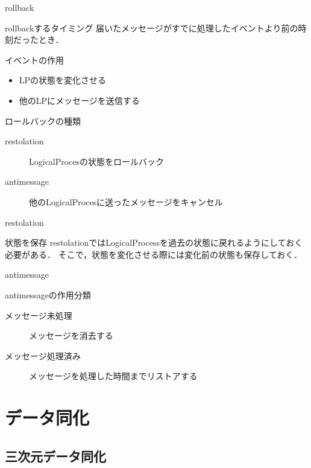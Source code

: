 \documentclass[dvipdfmx,uplatex,11pt]{beamer}
\theoremstyle{definition}
\begin{document}
\begin{frame}{rollback}
  \begin{block}{rollbackするタイミング}
    届いたメッセージがすでに処理したイベントより前の時刻だったとき．
  \end{block}
  \begin{block}{イベントの作用}
  \begin{itemize}
    \item LPの状態を変化させる
    \item 他のLPにメッセージを送信する
  \end{itemize}
  \end{block}
  \begin{block}{ロールバックの種類}
    \begin{description}
      \item[restolation] LogicalProcesの状態をロールバック
      \item[antimessage] 他のLogicalProcesに送ったメッセージをキャンセル
  \end{description}
  \end{block}
\end{frame}

\begin{frame}{restolation}
  \begin{block}{状態を保存}
    restolationではLogicalProcessを過去の状態に戻れるようにしておく必要がある．
    そこで，状態を変化させる際には変化前の状態も保存しておく．
  \end{block}
\end{frame}

\begin{frame}{antimessage}
  \begin{block}{antimessageの作用分類}
    \begin{description}
      \item[メッセージ未処理] メッセージを消去する
      \item[メッセージ処理済み]メッセージを処理した時間までリストアする
    \end{description}
  \end{block}
\end{frame}

\section{データ同化}
 \subsection{三次元データ同化}
\end{document}
